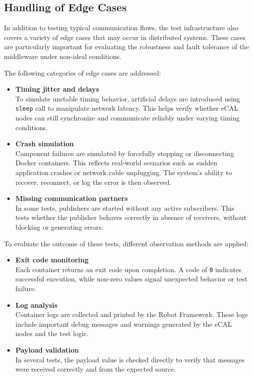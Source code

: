 \newpage
\subsection{Handling of Edge Cases}

In addition to testing typical communication flows, the test infrastructure also covers a variety of edge cases that may occur in distributed systems. These cases are particularly important for evaluating the robustness and fault tolerance of the middleware under non-ideal conditions.

\vspace{0.5em}
The following categories of edge cases are addressed:

\begin{itemize}
	\item \textbf{Timing jitter and delays} \\
	To simulate unstable timing behavior, artificial delays are introduced using \texttt{sleep} call to manipulate network latency. This helps verify whether eCAL nodes can still synchronize and communicate reliably under varying timing conditions.
	
	\item \textbf{Crash simulation} \\
	Component failures are simulated by forcefully stopping or disconnecting Docker containers. This reflects real-world scenarios such as sudden application crashes or network cable unplugging. The system’s ability to recover, reconnect, or log the error is then observed.
	
	\item \textbf{Missing communication partners} \\
	In some tests, publishers are started without any active subscribers. This tests whether the publisher behaves correctly in absence of receivers, without blocking or generating errors.
\end{itemize}

\vspace{0.5em}
To evaluate the outcome of these tests, different observation methods are applied:

\begin{itemize}
	\item \textbf{Exit code monitoring} \\
	Each container returns an exit code upon completion. A code of \texttt{0} indicates successful execution, while non-zero values signal unexpected behavior or test failure.
	
	\item \textbf{Log analysis} \\
	Container logs are collected and printed by the Robot Framework. These logs include important debug messages and warnings generated by the eCAL nodes and the test logic.
	
	\item \textbf{Payload validation} \\
	In several tests, the payload value is checked directly to verify that messages were received correctly and from the expected source.
\end{itemize}

